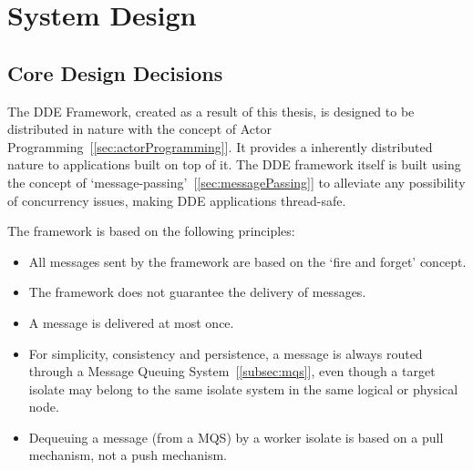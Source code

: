 \chapter{System Design}
\label{chapter:system_design}

\section{Core Design Decisions}
  The DDE Framework, created as a result of this thesis, is designed to be distributed in nature with the concept of Actor Programming~[\autoref{sec:actorProgramming}]. It provides a inherently distributed nature to applications built on top of it. The DDE framework itself is built using the concept of ‘message-passing’~[\autoref{sec:messagePassing}] to alleviate any possibility of concurrency issues, making DDE applications thread-safe.

  The framework is based on the following principles:
\begin{itemize}
  \item All messages sent by the framework are based on the ‘fire and forget’ concept.
  \item The framework does not guarantee the delivery of messages.
  \item A message is delivered at most once.
  \item For simplicity, consistency and persistence, a message is always routed through a Message Queuing System~[\autoref{subsec:mqs}], even though a target isolate may belong to the same isolate system in the same logical or physical node.
  \item Dequeuing a message (from a MQS) by a worker isolate is based on a pull mechanism, not a push mechanism.
\end{itemize}

